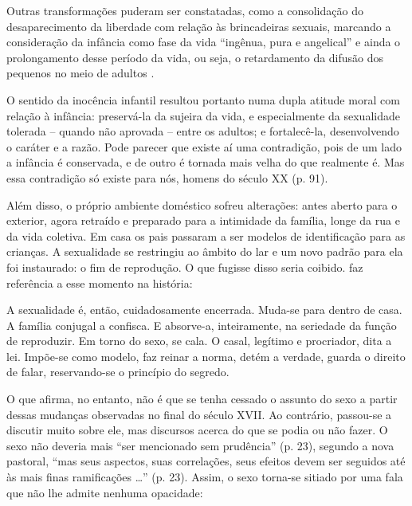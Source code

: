 Outras transformações puderam ser constatadas, como a consolidação do desaparecimento da liberdade com relação às brincadeiras sexuais, marcando a consideração da infância como fase da vida ``ingênua, pura e angelical'' e ainda o prolongamento desse período da vida, ou seja, o retardamento da difusão dos pequenos no meio de adultos \cite{ARIES2011}. 

\begin{citacao}
	O sentido da inocência infantil resultou portanto numa dupla atitude moral com relação à infância: preservá-la da sujeira da vida, e especialmente da sexualidade tolerada -- quando não aprovada -- entre os adultos; e fortalecê-la, desenvolvendo o caráter e a razão. Pode parecer que existe aí uma contradição, pois de um lado a infância é conservada, e de outro é tornada mais velha do que realmente é. Mas essa contradição só existe para nós, homens do século XX (p. 91).
\end{citacao}

Além disso, o próprio ambiente doméstico sofreu alterações: antes aberto para o exterior, agora retraído e preparado para a intimidade da família, longe da rua e da vida coletiva. Em casa os pais passaram a ser modelos de identificação para as crianças. A sexualidade se restringiu ao âmbito do lar e um novo padrão para ela foi instaurado: o fim de reprodução. O que fugisse disso seria coibido.  faz referência a esse momento na história:

\begin{citacao}
	A sexualidade é, então, cuidadosamente encerrada. Muda-se para dentro de casa. A família conjugal a confisca. E absorve-a, inteiramente, na seriedade da função de reproduzir. Em torno do sexo, se cala. O casal, legítimo e procriador, dita a lei. Impõe-se como modelo, faz reinar a norma, detém a verdade, guarda o direito de falar, reservando-se o princípio do segredo.
\end{citacao}

O que  afirma, no entanto, não é que se tenha cessado o assunto do sexo a partir dessas mudanças observadas no final do século XVII. Ao contrário, passou-se a discutir muito sobre ele, mas discursos acerca do que se podia ou não fazer. O sexo não deveria mais ``ser mencionado sem prudência'' (p. 23), segundo a nova pastoral, ``mas seus aspectos, suas correlações, seus efeitos devem ser seguidos até às mais finas ramificações \ldots'' (p. 23). Assim, o sexo torna-se sitiado por uma fala que não lhe admite nenhuma opacidade:

